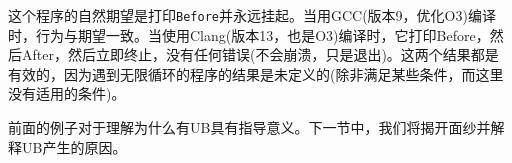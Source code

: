 这个程序的自然期望是打印\texttt{Before}并永远挂起。当用GCC(版本9，优化O3)编译时，行为与期望一致。当使用Clang(版本13，也是O3)编译时，它打印Before，然后After，然后立即终止，没有任何错误(不会崩溃，只是退出)。这两个结果都是有效的，因为遇到无限循环的程序的结果是未定义的(除非满足某些条件，而这里没有适用的条件)。

前面的例子对于理解为什么有UB具有指导意义。下一节中，我们将揭开面纱并解释UB产生的原因。

























